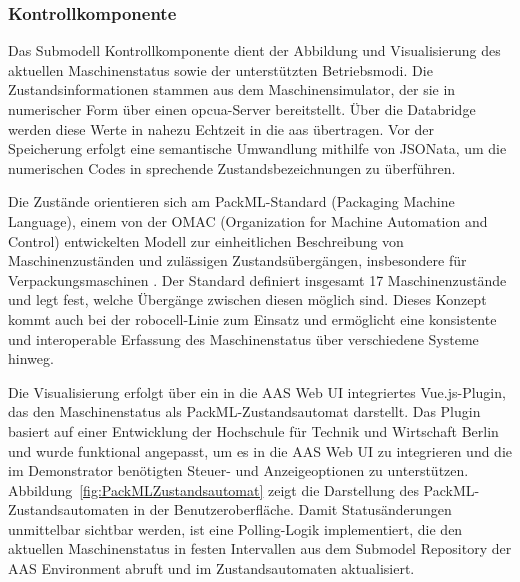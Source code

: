\subsubsection*{Kontrollkomponente}
Das Submodell Kontrollkomponente dient der Abbildung und Visualisierung des aktuellen Maschinenstatus sowie der unterstützten Betriebsmodi.
Die Zustandsinformationen stammen aus dem Maschinensimulator, der sie in numerischer Form über einen \acs{opcua}-Server bereitstellt.
Über die Databridge werden diese Werte in nahezu Echtzeit in die \acs{aas} übertragen.
Vor der Speicherung erfolgt eine semantische Umwandlung mithilfe von JSONata, um die numerischen Codes in sprechende Zustandsbezeichnungen zu überführen.

Die Zustände orientieren sich am PackML-Standard (Packaging Machine Language), einem von der OMAC (Organization for Machine Automation and Control) entwickelten Modell zur einheitlichen Beschreibung von Maschinenzuständen und zulässigen Zustandsübergängen, insbesondere für Verpackungsmaschinen \cite{OMAC}. 
Der Standard definiert insgesamt 17 Maschinenzustände und legt fest, welche Übergänge zwischen diesen möglich sind. 
Dieses Konzept kommt auch bei der robocell-Linie zum Einsatz und ermöglicht eine konsistente und interoperable Erfassung des Maschinenstatus über verschiedene Systeme hinweg.

Die Visualisierung erfolgt über ein in die AAS Web UI integriertes Vue.js-Plugin, das den Maschinenstatus als PackML-Zustandsautomat darstellt.
Das Plugin basiert auf einer Entwicklung der Hochschule für Technik und Wirtschaft Berlin \cite{HTW1, HTW2} und wurde funktional angepasst, um es in die AAS Web UI zu integrieren und die im Demonstrator benötigten Steuer- und Anzeigeoptionen zu unterstützen.
Abbildung~\ref{fig:PackMLZustandsautomat} zeigt die Darstellung des PackML-Zustandsautomaten in der Benutzeroberfläche.
Damit Statusänderungen unmittelbar sichtbar werden, ist eine Polling-Logik implementiert, die den aktuellen Maschinenstatus in festen Intervallen aus dem Submodel Repository der AAS Environment abruft und im Zustandsautomaten aktualisiert.

